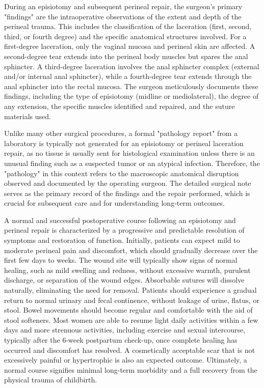 During an episiotomy and subsequent perineal repair, the surgeon's primary "findings" are the intraoperative observations of the extent and depth of the perineal trauma. This includes the classification of the laceration (first, second, third, or fourth degree) and the specific anatomical structures involved. For a first-degree laceration, only the vaginal mucosa and perineal skin are affected. A second-degree tear extends into the perineal body muscles but spares the anal sphincter. A third-degree laceration involves the anal sphincter complex (external and/or internal anal sphincter), while a fourth-degree tear extends through the anal sphincter into the rectal mucosa. The surgeon meticulously documents these findings, including the type of episiotomy (midline or mediolateral), the degree of any extension, the specific muscles identified and repaired, and the suture materials used.

Unlike many other surgical procedures, a formal "pathology report" from a laboratory is typically not generated for an episiotomy or perineal laceration repair, as no tissue is usually sent for histological examination unless there is an unusual finding such as a suspected tumor or an atypical infection. Therefore, the "pathology" in this context refers to the macroscopic anatomical disruption observed and documented by the operating surgeon. The detailed surgical note serves as the primary record of the findings and the repair performed, which is crucial for subsequent care and for understanding long-term outcomes.

A normal and successful postoperative course following an episiotomy and perineal repair is characterized by a progressive and predictable resolution of symptoms and restoration of function. Initially, patients can expect mild to moderate perineal pain and discomfort, which should gradually decrease over the first few days to weeks. The wound site will typically show signs of normal healing, such as mild swelling and redness, without excessive warmth, purulent discharge, or separation of the wound edges. Absorbable sutures will dissolve naturally, eliminating the need for removal. Patients should experience a gradual return to normal urinary and fecal continence, without leakage of urine, flatus, or stool. Bowel movements should become regular and comfortable with the aid of stool softeners. Most women are able to resume light daily activities within a few days and more strenuous activities, including exercise and sexual intercourse, typically after the 6-week postpartum check-up, once complete healing has occurred and discomfort has resolved. A cosmetically acceptable scar that is not excessively painful or hypertrophic is also an expected outcome. Ultimately, a normal course signifies minimal long-term morbidity and a full recovery from the physical trauma of childbirth.

